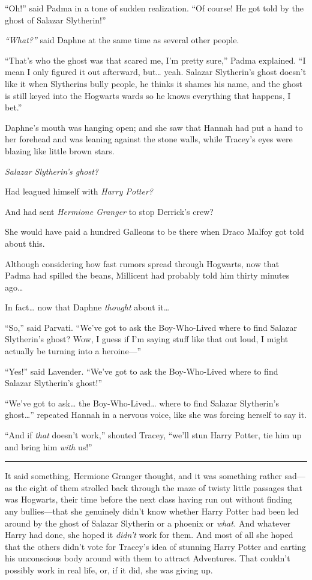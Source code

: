 ``Oh!'' said Padma in a tone of sudden realization. ``Of course! He got
told by the ghost of Salazar Slytherin!''

\emph{``What?''} said Daphne at the same time as several other people.

``That's who the ghost was that scared me, I'm pretty sure,'' Padma
explained. ``I mean I only figured it out afterward, but\ldots{} yeah.
Salazar Slytherin's ghost doesn't like it when Slytherins bully people,
he thinks it shames his name, and the ghost is still keyed into the
Hogwarts wards so he knows everything that happens, I bet.''

Daphne's mouth was hanging open; and she saw that Hannah had put a hand
to her forehead and was leaning against the stone walls, while Tracey's
eyes were blazing like little brown stars.

\emph{Salazar Slytherin's ghost?}

Had leagued himself with \emph{Harry Potter?}

And had sent \emph{Hermione Granger} to stop Derrick's crew?

She would have paid a hundred Galleons to be there when Draco Malfoy got
told about this.

Although considering how fast rumors spread through Hogwarts, now that
Padma had spilled the beans, Millicent had probably told him thirty
minutes ago\ldots{}

In fact\ldots{} now that Daphne \emph{thought} about it\ldots{}

``So,'' said Parvati. ``We've got to ask the Boy-Who-Lived where to find
Salazar Slytherin's ghost? Wow, I guess if I'm saying stuff like that
out loud, I might actually be turning into a heroine---''

``Yes!'' said Lavender. ``We've got to ask the Boy-Who-Lived where to
find Salazar Slytherin's ghost!''

``We've got to ask\ldots{} the Boy-Who-Lived\ldots{} where to find
Salazar Slytherin's ghost\ldots{}'' repeated Hannah in a nervous voice,
like she was forcing herself to say it.

``And if \emph{that} doesn't work,'' shouted Tracey, ``we'll stun Harry
Potter, tie him up and bring him \emph{with} us!''

\begin{center}\rule{3in}{0.4pt}\end{center}

It said something, Hermione Granger thought, and it was something rather
sad---as the eight of them strolled back through the maze of twisty
little passages that was Hogwarts, their time before the next class
having run out without finding any bullies---that she genuinely didn't
know whether Harry Potter had been led around by the ghost of Salazar
Slytherin or a phoenix or \emph{what.} And whatever Harry had done, she
hoped it \emph{didn't} work for them. And most of all she hoped that the
others didn't vote for Tracey's idea of stunning Harry Potter and
carting his unconscious body around with them to attract Adventures.
That couldn't possibly work in real life, or, if it did, she was giving
up.

